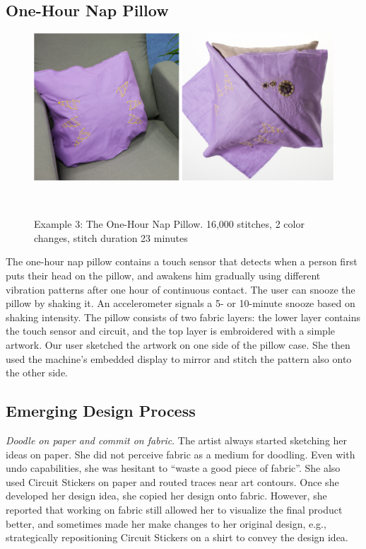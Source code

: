 \documentclass[header.tex]{subfiles}
\begin{document}
\subsection{One-Hour Nap Pillow}
\begin{figure} [h!]
\centering
  \includegraphics[width=0.9\columnwidth]{figures/Pillow}
  \caption{Example 3: The One-Hour Nap Pillow. 16,000 stitches, 2 color changes, stitch duration 23 minutes}~\label{fig:Pillow}
  \vspace{-0.5em}
\end{figure}
The one-hour nap pillow contains a touch sensor that detects when a person first puts their head on the pillow, and awakens him gradually using different vibration patterns after one hour of continuous contact. The user can snooze the pillow by shaking it. An accelerometer signals a 5- or 10-minute snooze based on shaking intensity. The pillow consists of two fabric layers: the lower layer contains the touch sensor and circuit, and the top layer is embroidered with a simple artwork. Our user sketched the artwork on one side of the pillow case. She then used the machine's embedded display to mirror and stitch the pattern also onto the other side. 


\subsection{Emerging Design Process}
\textit{Doodle on paper and commit on fabric}. The artist always started sketching her ideas on paper. She did not perceive fabric as a medium for doodling. Even with undo capabilities, she was hesitant to ``waste a good piece of fabric''. She also used Circuit Stickers on paper and routed traces near art contours. Once she developed her design idea, she copied her design onto fabric. However, she reported that working on fabric still allowed her to visualize the final product better, and sometimes made her make changes to her original design, e.g., strategically repositioning Circuit Stickers on a shirt to convey the design idea.
\end{document}
